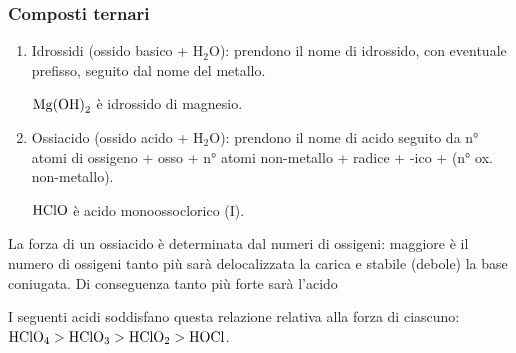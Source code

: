 \subsubsection{Composti ternari}
\begin{enumerate}
    \item Idrossidi (ossido basico + H$_2$O): prendono il nome di idrossido, con eventuale prefisso, seguito dal nome del metallo.
    \begin{ex}
        $\ce{Mg(OH)2}$ è idrossido di magnesio.
    \end{ex}
    \item Ossiacido (ossido acido + H$_2$O): prendono il nome di acido seguito da \textnormal{n° atomi di ossigeno + osso + n° atomi non-metallo + radice + -ico + (n° ox. non-metallo)}.
    \begin{ex}
        $\ce{HClO}$ è acido monoossoclorico (I).
    \end{ex}
\end{enumerate}
La forza di un ossiacido è determinata dal numeri di ossigeni: maggiore è il numero di ossigeni tanto più sarà delocalizzata la carica e stabile (debole) la base coniugata. Di conseguenza tanto più forte sarà l'acido
\begin{ex}
    I seguenti acidi soddisfano questa relazione relativa alla forza di ciascuno: $\textnormal{HClO}_4>\textnormal{HClO}_3>\textnormal{HClO}_2>\textnormal{HOCl}$.
\end{ex}